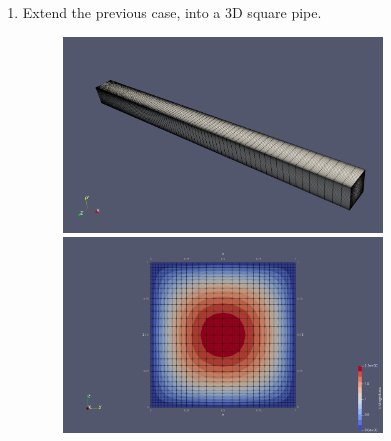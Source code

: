 \documentclass{article}
\begin{document}
\begin{enumerate}
	\newpage
 	\item Extend the previous case, into a 3D square pipe.
 	
	\begin{figure}[h]
		\centering
 		\includegraphics[width=0.8\textwidth]{3D_mesh2.png}
 		\includegraphics[width=0.8\textwidth]{3D_velocity.png}
	\end{figure}

	
\end{enumerate}
	
\end{document}
